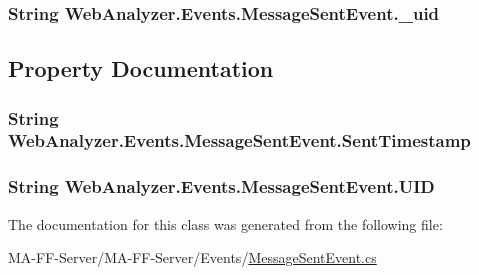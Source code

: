 \subsubsection[{\+\_\+uid}]{\setlength{\rightskip}{0pt plus 5cm}String Web\+Analyzer.\+Events.\+Message\+Sent\+Event.\+\_\+uid\hspace{0.3cm}{\ttfamily [private]}}\label{class_web_analyzer_1_1_events_1_1_message_sent_event_a38d54d167e7fbe337cfe766aa47c1229}


\subsection{Property Documentation}
\hypertarget{class_web_analyzer_1_1_events_1_1_message_sent_event_a7408640c7a1d8de43f36ca70b01c49b0}{}
\subsubsection[{Sent\+Timestamp}]{\setlength{\rightskip}{0pt plus 5cm}String Web\+Analyzer.\+Events.\+Message\+Sent\+Event.\+Sent\+Timestamp\hspace{0.3cm}{\ttfamily [get]}}\label{class_web_analyzer_1_1_events_1_1_message_sent_event_a7408640c7a1d8de43f36ca70b01c49b0}
\hypertarget{class_web_analyzer_1_1_events_1_1_message_sent_event_a04217696019822bcc61e6890810b8442}{}
\subsubsection[{U\+I\+D}]{\setlength{\rightskip}{0pt plus 5cm}String Web\+Analyzer.\+Events.\+Message\+Sent\+Event.\+U\+I\+D\hspace{0.3cm}{\ttfamily [get]}}\label{class_web_analyzer_1_1_events_1_1_message_sent_event_a04217696019822bcc61e6890810b8442}


The documentation for this class was generated from the following file\+:\begin{DoxyCompactItemize}
\item 
M\+A-\/\+F\+F-\/\+Server/\+M\+A-\/\+F\+F-\/\+Server/\+Events/\hyperlink{_message_sent_event_8cs}{Message\+Sent\+Event.\+cs}\end{DoxyCompactItemize}
